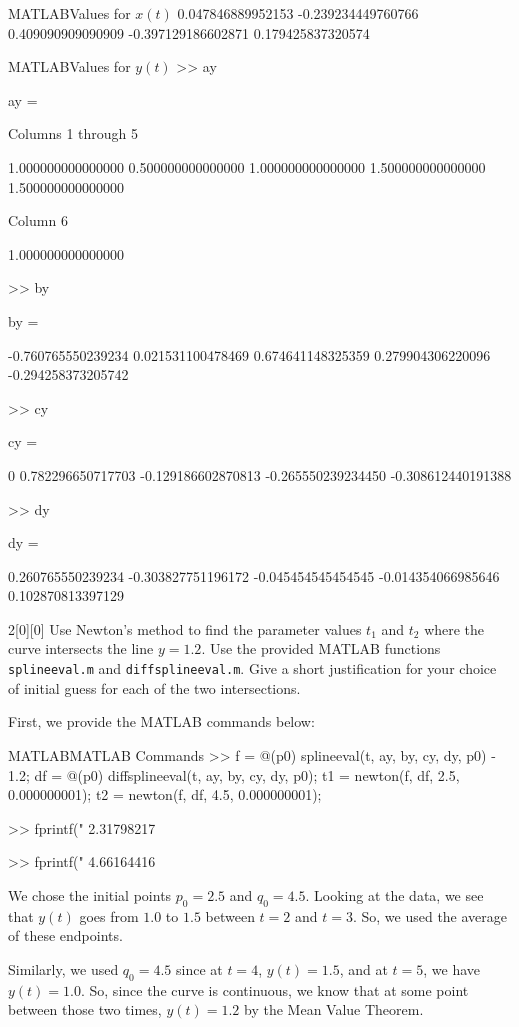 \documentclass{article}
\begin{document}
\begin{solution}
\begin{code}{MATLAB}{Values for $x(t)$}
0.047846889952153  -0.239234449760766   0.409090909090909  -0.397129186602871   0.179425837320574
\end{code}

\begin{code}{MATLAB}{Values for $y(t)$}
>> ay

ay =

Columns 1 through 5

1.000000000000000   0.500000000000000   1.000000000000000   1.500000000000000   1.500000000000000

Column 6

1.000000000000000

>> by

by =

-0.760765550239234   0.021531100478469   0.674641148325359   0.279904306220096  -0.294258373205742

>> cy

cy =

0   0.782296650717703  -0.129186602870813  -0.265550239234450  -0.308612440191388

>> dy

dy =

0.260765550239234  -0.303827751196172  -0.045454545454545  -0.014354066985646   0.102870813397129
\end{code}
\end{solution}

\begin{hw}{2}[0][0]
	Use Newton's method to find the parameter values $t_1$ and $t_2$ where the curve intersects the line
	$y = 1.2$. Use the provided MATLAB functions \texttt{splineeval.m} and \texttt{diffsplineeval.m}. Give a
	short justification for your choice of initial guess for each of the two intersections.
\end{hw}
\begin{solution}
	First, we provide the MATLAB commands below:
\begin{code}{MATLAB}{MATLAB Commands}
>> f = @(p0) splineeval(t, ay, by, cy, dy, p0) - 1.2;
df = @(p0) diffsplineeval(t, ay, by, cy, dy, p0);
t1 = newton(f, df, 2.5, 0.000000001);
t2 = newton(f, df, 4.5, 0.000000001);

>> fprintf("%
2.31798217

>> fprintf("%
4.66164416
\end{code}

We chose the initial points $p_0 = 2.5$ and $q_0 = 4.5$. Looking at the data, we see that $y(t)$ goes from $1.0$ to $1.5$ between $t = 2$ and $t = 3$. So, we used the average of these endpoints.

Similarly, we used $q_0 = 4.5$ since at $t = 4$, $y(t) = 1.5$, and at $t = 5$, we have $y(t) = 1.0$. So, since the curve is continuous, we know that at some point between those two times, $y(t) = 1.2$ by the Mean Value Theorem.    
\end{solution}
\end{document}
